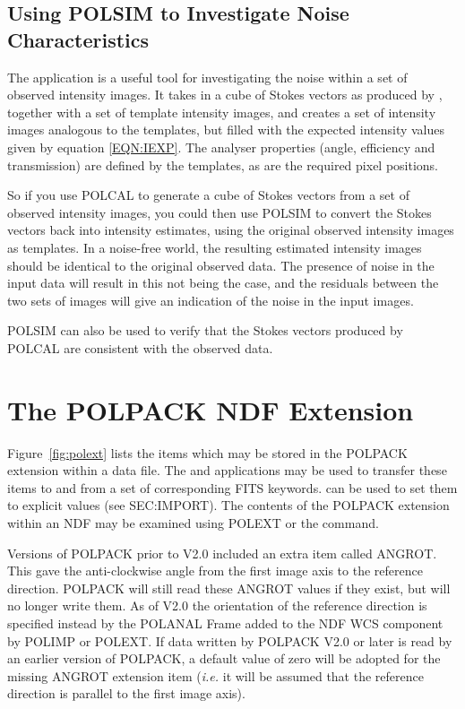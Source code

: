 \documentclass[twoside,11pt]{starlink}
\begin{document}
\subsection{Using POLSIM to Investigate Noise Characteristics}
The  application is a useful tool for
investigating the noise within a set of observed intensity images. It
takes in a cube of Stokes vectors as produced by ,
together with a set of template intensity images, and creates a set of
intensity images analogous to the templates, but filled with the expected
intensity values given by equation \ref{EQN:IEXP}. The analyser properties
(angle, efficiency and transmission) are defined by the templates, as are
the required pixel positions.

So if you use POLCAL to generate a cube of Stokes vectors from a set of
observed intensity images, you could then use POLSIM to convert the
Stokes vectors back into intensity estimates, using the original observed
intensity images as templates. In a noise-free world, the resulting
estimated intensity images should be identical to the original observed
data. The presence of noise in the input data will result in this not
being the case, and the residuals between the two sets of images will
give an indication of the noise in the input images.

POLSIM can also be used to verify that the Stokes vectors produced by
POLCAL are consistent with the observed data.

\section{\label{APP:POLEXT}The POLPACK NDF Extension}

Figure~\ref{fig:polext} lists the items which may be stored in the
POLPACK extension within a data file. The  and
 applications may be used to transfer these items
to and from a set of corresponding FITS keywords. 
can be used to set them to explicit values (see 
{}{SEC:IMPORT}). The contents of the POLPACK extension within an NDF may be
examined using POLEXT or the  command.

Versions of POLPACK prior to V2.0 included an extra item called ANGROT.
This gave the anti-clockwise angle from the first image axis to the
reference direction. POLPACK will still read these ANGROT values if they exist,
but will no longer write them. As of V2.0 the orientation of the reference
direction is specified instead by the POLANAL Frame added to the NDF WCS
component by POLIMP or POLEXT. If data written by POLPACK V2.0 or later
is read by an earlier version of POLPACK, a default value of zero will be
adopted for the missing ANGROT extension item (\emph{i.e.} it will be
assumed that the reference direction is parallel to the first image axis).
\end{document}
